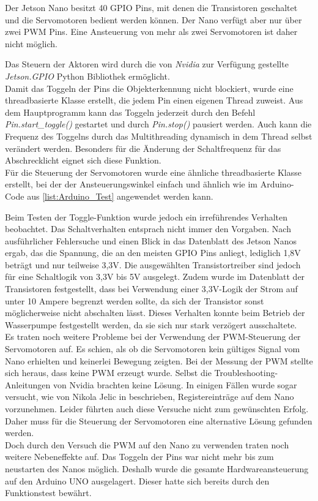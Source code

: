 Der Jetson Nano besitzt 40 \ac{GPIO} Pins, mit denen die Transistoren geschaltet und die Servomotoren bedient werden können. Der Nano verfügt aber nur über zwei \ac{PWM} Pins. Eine Ansteuerung von mehr als zwei Servomotoren ist daher nicht möglich. \cite{jn_datasheet}

Das Steuern der Aktoren wird durch die von \textit{Nvidia} zur Verfügung gestellte \textit{Jetson.GPIO} Python Bibliothek ermöglicht. \cite{git_jn_gpio}
\\
Damit das Toggeln der Pins die Objekterkennung nicht blockiert, wurde eine threadbasierte Klasse erstellt, die jedem Pin einen eigenen Thread zuweist. Aus dem Hauptprogramm kann das Toggeln jederzeit durch den Befehl \textit{Pin.start\_toggle()} gestartet und durch \textit{Pin.stop()} pausiert werden. Auch kann die Frequenz des Toggelns durch das Multithreading dynamisch in dem Thread selbst verändert werden. Besonders für die Änderung der Schaltfrequenz für das Abschrecklicht eignet sich diese Funktion.
\\
Für die Steuerung der Servomotoren wurde eine ähnliche threadbasierte Klasse erstellt, bei der der Ansteuerungswinkel einfach und ähnlich wie im Arduino-Code aus \ref{list:Arduino_Test} angewendet werden kann.

Beim Testen der Toggle-Funktion wurde jedoch ein irreführendes Verhalten beobachtet. Das Schaltverhalten entsprach nicht immer den Vorgaben. Nach ausführlicher Fehlersuche und einen Blick in das Datenblatt des Jetson Nanos ergab, das die Spannung, die an den meisten \ac{GPIO} Pins anliegt, lediglich 1,8V beträgt und nur teilweise 3,3V. Die ausgewählten Transistortreiber sind jedoch für eine Schaltlogik von 3,3V bis 5V ausgelegt. Zudem wurde im Datenblatt der Transistoren festgestellt, dass bei Verwendung einer 3,3V-Logik der Strom auf unter 10 Ampere begrenzt werden sollte, da sich der Transistor sonst möglicherweise nicht abschalten lässt. Dieses Verhalten konnte beim Betrieb der Wasserpumpe festgestellt werden, da sie sich nur stark verzögert ausschaltete.
\\
Es traten noch weitere Probleme bei der Verwendung der \ac{PWM}-Steuerung der Servomotoren auf. Es schien, als ob die Servomotoren kein gültiges Signal vom Nano erhielten und keinerlei Bewegung zeigten. Bei der Messung der \ac{PWM} stellte sich heraus, dass keine \ac{PWM} erzeugt wurde. Selbst die Troubleshooting-Anleitungen von Nvidia brachten keine Lösung. In einigen Fällen wurde sogar versucht, wie von Nikola Jelic in \cite{forum_wrong_pwm} beschrieben, Registereinträge auf dem Nano vorzunehmen. Leider führten auch diese Versuche nicht zum gewünschten Erfolg. Daher muss für die Steuerung der Servomotoren eine alternative Lösung gefunden werden.
\\
Doch durch den Versuch die \ac{PWM} auf den Nano zu verwenden traten noch weitere Nebeneffekte auf. Das Toggeln der Pins war nicht mehr bis zum neustarten des Nanos möglich. Deshalb wurde die gesamte Hardwareansteuerung auf den Arduino UNO ausgelagert. Dieser hatte sich bereits durch den Funktionstest bewährt.

